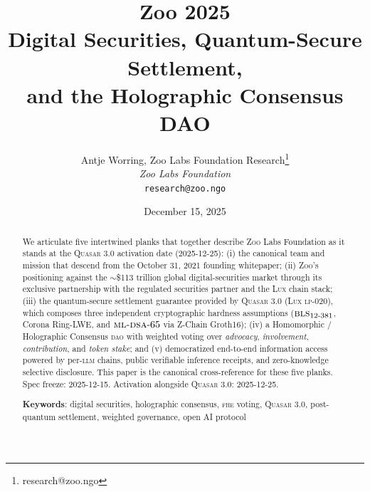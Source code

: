 \documentclass[11pt,letterpaper]{article}
\title{\textbf{Zoo 2025}\\
\large Digital Securities, Quantum-Secure Settlement,\\and the Holographic Consensus DAO}
\author{
Antje Worring, Zoo Labs Foundation Research\thanks{research@zoo.ngo}\\
\textit{Zoo Labs Foundation}\\
\texttt{research@zoo.ngo}
}
\date{December 15, 2025}
\newcommand{\Zoo}{\textsc{Zoo}}
\newcommand{\Lux}{\textsc{Lux}}
\newcommand{\Quasar}{\textsc{Quasar}}
\newcommand{\Partner}{the regulated securities partner}
\newcommand{\DAO}{\textsc{dao}}
\newcommand{\FHE}{\textsc{fhe}}
\newcommand{\BLS}{\textsc{bls}}
\newcommand{\MLDSA}{\textsc{ml-dsa}}
\begin{document}
\zoocoverpage

\begin{abstract}
\noindent We articulate five intertwined planks that together describe \Zoo{}
Labs Foundation as it stands at the \Quasar{} 3.0 activation date
(2025-12-25): (i) the canonical team and mission that descend from the
October 31, 2021 founding whitepaper; (ii) \Zoo{}'s positioning against the
$\sim$\$113 trillion global digital-securities market through its exclusive
partnership with \Partner{} and the \Lux{} chain stack; (iii) the
quantum-secure settlement guarantee provided by \Quasar{} 3.0
(\Lux{} \textsc{lp-020}), which composes three independent cryptographic
hardness assumptions ($\BLS{}_{12\text{-}381}$, Corona Ring-LWE, and
$\MLDSA{}\text{-}65$ via Z-Chain Groth16); (iv) a Homomorphic / Holographic
Consensus \DAO{} with weighted voting over \emph{advocacy}, \emph{involvement},
\emph{contribution}, and \emph{token stake}; and (v) democratized end-to-end
information access powered by per-\textsc{llm} chains, public verifiable
inference receipts, and zero-knowledge selective disclosure. This paper is
the canonical cross-reference for these five planks. Spec freeze:
2025-12-15. Activation alongside \Quasar{} 3.0: 2025-12-25.

\textbf{Keywords}: digital securities, holographic consensus, \FHE{} voting,
\Quasar{} 3.0, post-quantum settlement, weighted governance, open AI protocol
\end{abstract}

\tableofcontents
\newpage







\end{document}
